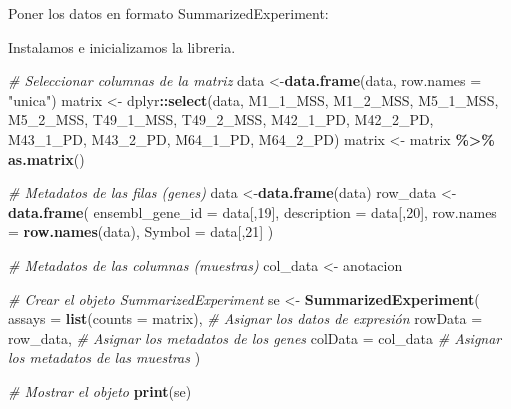 \documentclass[
]{article}
\newenvironment{Shaded}{\begin{snugshade}}{\end{snugshade}}
\newcommand{\AttributeTok}[1]{\textcolor[rgb]{0.13,0.29,0.53}{#1}}
\newcommand{\CommentTok}[1]{\textcolor[rgb]{0.56,0.35,0.01}{\textit{#1}}}
\newcommand{\DecValTok}[1]{\textcolor[rgb]{0.00,0.00,0.81}{#1}}
\newcommand{\FunctionTok}[1]{\textcolor[rgb]{0.13,0.29,0.53}{\textbf{#1}}}
\newcommand{\NormalTok}[1]{#1}
\newcommand{\OtherTok}[1]{\textcolor[rgb]{0.56,0.35,0.01}{#1}}
\newcommand{\SpecialCharTok}[1]{\textcolor[rgb]{0.81,0.36,0.00}{\textbf{#1}}}
\newcommand{\StringTok}[1]{\textcolor[rgb]{0.31,0.60,0.02}{#1}}
\begin{document}
Poner los datos en formato SummarizedExperiment:

Instalamos e inicializamos la libreria.

\begin{Shaded}
\begin{Highlighting}[]
\CommentTok{\# Seleccionar columnas de la matriz}
\NormalTok{data }\OtherTok{\textless{}{-}}\FunctionTok{data.frame}\NormalTok{(data, }\AttributeTok{row.names =} \StringTok{"unica"}\NormalTok{)}
\NormalTok{matrix }\OtherTok{\textless{}{-}}\NormalTok{ dplyr}\SpecialCharTok{::}\FunctionTok{select}\NormalTok{(data, M1\_1\_MSS, M1\_2\_MSS, M5\_1\_MSS, M5\_2\_MSS, T49\_1\_MSS, T49\_2\_MSS, M42\_1\_PD, M42\_2\_PD, M43\_1\_PD, M43\_2\_PD, M64\_1\_PD, M64\_2\_PD) }
\NormalTok{matrix }\OtherTok{\textless{}{-}}\NormalTok{ matrix }\SpecialCharTok{\%\textgreater{}\%} \FunctionTok{as.matrix}\NormalTok{()}

\CommentTok{\# Metadatos de las filas (genes)}
\NormalTok{data }\OtherTok{\textless{}{-}}\FunctionTok{data.frame}\NormalTok{(data)}
\NormalTok{row\_data }\OtherTok{\textless{}{-}} \FunctionTok{data.frame}\NormalTok{(}
  \AttributeTok{ensembl\_gene\_id =}\NormalTok{ data[,}\DecValTok{19}\NormalTok{],}
  \AttributeTok{description =}\NormalTok{ data[,}\DecValTok{20}\NormalTok{],}
  \AttributeTok{row.names =} \FunctionTok{row.names}\NormalTok{(data),}
  \AttributeTok{Symbol =}\NormalTok{ data[,}\DecValTok{21}\NormalTok{]}
\NormalTok{)}

\CommentTok{\# Metadatos de las columnas (muestras)}
\NormalTok{col\_data }\OtherTok{\textless{}{-}}\NormalTok{ anotacion}
\end{Highlighting}
\end{Shaded}

\begin{Shaded}
\begin{Highlighting}[]
\CommentTok{\# Crear el objeto SummarizedExperiment}
\NormalTok{se }\OtherTok{\textless{}{-}} \FunctionTok{SummarizedExperiment}\NormalTok{(}
  \AttributeTok{assays =} \FunctionTok{list}\NormalTok{(}\AttributeTok{counts =}\NormalTok{ matrix),  }\CommentTok{\# Asignar los datos de expresión}
  \AttributeTok{rowData =}\NormalTok{ row\_data,              }\CommentTok{\# Asignar los metadatos de los genes}
  \AttributeTok{colData =}\NormalTok{ col\_data               }\CommentTok{\# Asignar los metadatos de las muestras}
\NormalTok{)}

\CommentTok{\# Mostrar el objeto}
\FunctionTok{print}\NormalTok{(se)}
\end{Highlighting}
\end{Shaded}
\end{document}
